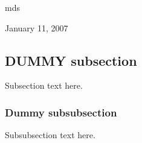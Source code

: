 \documentclass[journal]{IEEEtran}
\begin{document}
\hfill mds
 
\hfill January 11, 2007

\subsection{DUMMY subsection}
Subsection text here.


\subsubsection{Dummy subsubsection}
Subsubsection text here.


%
%



%
%
\end{document}
